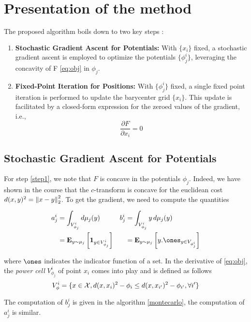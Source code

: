 \section{Presentation of the method}


The proposed algorithm \cite{claici_stochastic_2018} boils down to two key steps :
\begin{enumerate}
    \item \label{step1} \textbf{Stochastic Gradient Ascent for Potentials:} With $\lbrace x_i \rbrace$ fixed, a stochastic gradient ascent is employed to optimize the potentials $\lbrace \phi_j^i \rbrace$, leveraging the concavity of F \eqref{eq:obj} in $\phi_j$.
    \item \textbf{Fixed-Point Iteration for Positions:} With $\lbrace \phi_j^i \rbrace$ fixed, a single fixed point iteration is performed to update the barycenter grid $\lbrace x_i \rbrace$. This update is facilitated by a closed-form expression for the zeroed values of the gradient, i.e., $$\frac{\partial F}{\partial x_i} = 0$$
\end{enumerate}

\subsection{Stochastic Gradient Ascent for Potentials}

For step \ref{step1}, we note that $F$ is concave in the potentials $\phi_j$. Indeed, we have shown in the course \cite{peyre_computational_2020} that the $c$-transform is concave for the euclidean cost $d(x, y)^2 = \left\lVert x - y\right\rVert_2^2$. 
To get the gradient, we need to compute the quantities 


\begin{align*}
    a^i_j &= \int_{V_{\phi_j}^i} d\mu_j(y) & b_j^i &= \int_{V_{\phi_j}^i} y\, d\mu_j(y) \\
     &= \E_{y \sim \mu_j}\left[ \mathbf{1}_{y\in V_{\phi_j}^i}\right] & & =\E_{y \sim \mu_j}\left[ y . \ones_{y\in V_{\phi_j^i}}\right] \\
\end{align*}

where $\ones$ indicates the indicator function of a set. In the derivative of \eqref{eq:obj}, the \textit{power cell} $V_{\phi_j}^i$ of point $x_i$ comes into play and is defined as follows 
$$
V_{\phi}^i = \lbrace x\in\mathcal{X}, d(x, x_i)^2 - \phi_i \leq d(x, x_{i'})^2 - \phi_{i'}, \forall i'  \rbrace
$$

The computation of $b_j^i$ is given in the algorithm \ref{montecarlo}, the computation of $a_j^i$ is similar. 

